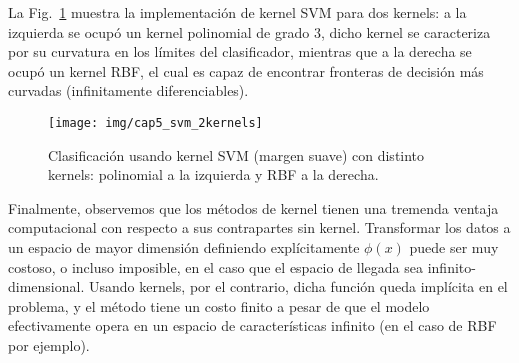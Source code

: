 La Fig.~\ref{fig:ksvm}  muestra la implementación de kernel SVM para dos kernels: a la izquierda se ocupó un kernel polinomial de grado $3$, dicho kernel se caracteriza por su curvatura en los límites del clasificador, mientras que a la derecha se ocupó un kernel RBF, el cual es capaz de encontrar fronteras de decisión más curvadas (infinitamente diferenciables).

\begin{figure}[ht]
    \centering
    \texttt{[image: img/cap5\_svm\_2kernels]}
    \caption{Clasificación usando kernel SVM (margen suave) con distinto kernels: polinomial a la izquierda y RBF a la derecha.}
    \label{fig:ksvm}
\end{figure}


Finalmente, observemos que los métodos de kernel tienen una tremenda ventaja computacional con respecto a sus contrapartes sin kernel. Transformar los datos a un espacio de mayor dimensión  definiendo explícitamente $\phi(x)$ puede ser muy costoso, o incluso imposible, en el caso que el espacio de llegada sea infinito-dimensional. Usando kernels, por el contrario, dicha función queda implícita en el problema, y el método tiene un costo finito a pesar de que el modelo efectivamente opera en un espacio de características infinito (en el caso de RBF por ejemplo).



\newpage
